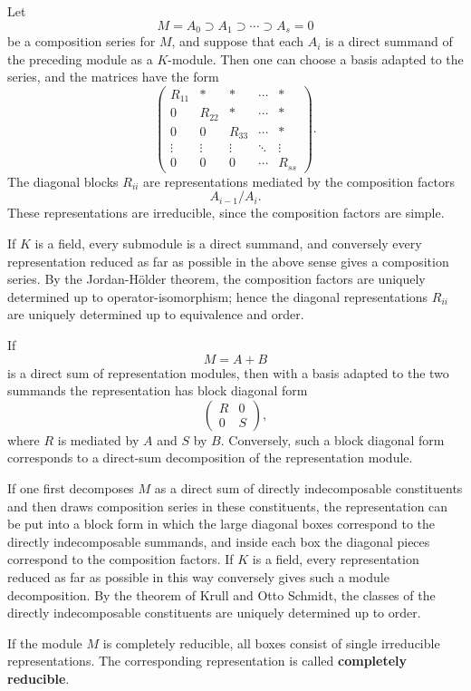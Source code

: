 \documentclass[11pt]{article}
\begin{document}
Let \[
  M=A_0\supset A_1\supset\cdots\supset A_s=0
\] be a composition series for \(M\), and suppose that each \(A_i\) is a
direct summand of the preceding module as a \(K\)-module. Then one can
choose a basis adapted to the series, and the matrices have the form \[
\begin{pmatrix}
R_{11}&*&*&\cdots&*\\
0&R_{22}&*&\cdots&*\\
0&0&R_{33}&\cdots&*\\
\vdots&\vdots&\vdots&\ddots&\vdots\\
0&0&0&\cdots&R_{ss}
\end{pmatrix}.
\] The diagonal blocks \(R_{ii}\) are representations mediated by the
composition factors \[
  A_{i-1}/A_i.
\] These representations are irreducible, since the composition factors
are simple.

If \(K\) is a field, every submodule is a direct summand, and conversely
every representation reduced as far as possible in the above sense gives
a composition series. By the Jordan-Hölder theorem, the composition
factors are uniquely determined up to operator-isomorphism; hence the
diagonal representations \(R_{ii}\) are uniquely determined up to
equivalence and order.

If \[
  M=A+B
\] is a direct sum of representation modules, then with a basis adapted
to the two summands the representation has block diagonal form \[
  \begin{pmatrix} R&0\\0&S\end{pmatrix},
\] where \(R\) is mediated by \(A\) and \(S\) by \(B\). Conversely, such
a block diagonal form corresponds to a direct-sum decomposition of the
representation module.

If one first decomposes \(M\) as a direct sum of directly indecomposable
constituents and then draws composition series in these constituents,
the representation can be put into a block form in which the large
diagonal boxes correspond to the directly indecomposable summands, and
inside each box the diagonal pieces correspond to the composition
factors. If \(K\) is a field, every representation reduced as far as
possible in this way conversely gives such a module decomposition. By
the theorem of Krull and Otto Schmidt, the classes of the directly
indecomposable constituents are uniquely determined up to order.

If the module \(M\) is completely reducible, all boxes consist of single
irreducible representations. The corresponding representation is called
\textbf{completely reducible}.
\end{document}
